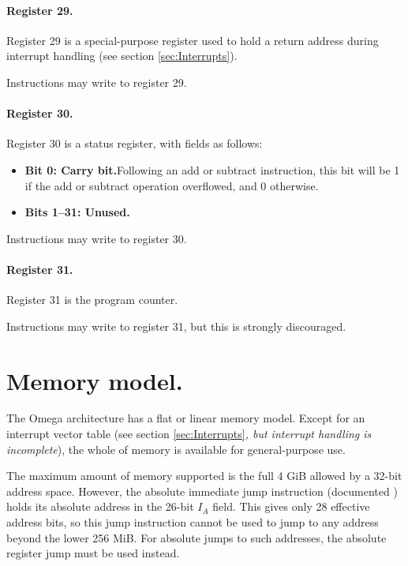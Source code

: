 \documentclass[12pt,english,twoside]{report}
\newcommand\incomplete[1]{{\color{red}\it #1}}
\begin{document}
\paragraph{Register 29.}
Register 29 is a special-purpose register used to hold a return
address during interrupt handling (see section \ref{sec:Interrupts}).

Instructions may write to register 29.

\paragraph{Register 30.}
Register 30 is a status register, with fields as follows:

\begin{itemize}
  \item \textbf{Bit 0: Carry bit.}\quad Following an add or subtract
    instruction, this bit will be 1 if the add or subtract operation
    overflowed, and 0 otherwise.
  \item \textbf{Bits 1--31: Unused.}
\end{itemize}

Instructions may write to register 30.

\paragraph{Register 31.}
Register 31 is the program counter.

Instructions may write to register 31, but this is strongly discouraged.

\section{Memory model.}

The Omega architecture has a flat or linear memory model. Except for
an interrupt vector table (see section
\ref{sec:Interrupts}\incomplete{, but interrupt handling is
  incomplete}), the whole of memory is available for general-purpose
use.

The maximum amount of memory supported is the full 4 GiB allowed by a
32-bit address space. However, the absolute immediate jump instruction
(documented ) holds its absolute address
in the 26-bit $I_A$ field. This gives only 28 effective address bits,
so this jump instruction cannot be used to jump to any address beyond
the lower 256 MiB. For absolute jumps to such addresses, the absolute
register jump must be used instead.
\end{document}

